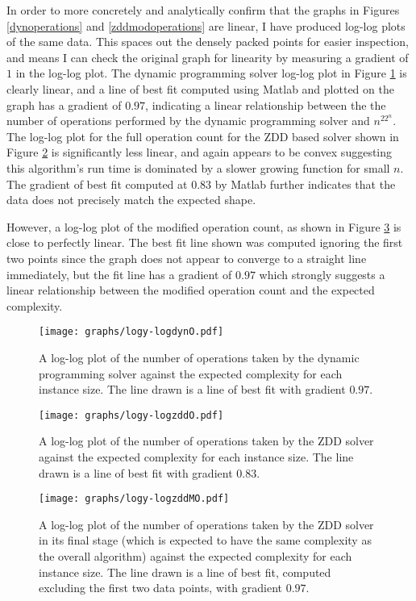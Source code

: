 \documentclass[12pt,a4paper,twoside,openright]{report}
\begin{document}
In order to more concretely and analytically confirm that the graphs in Figures \ref{dynoperations} and \ref{zddmodoperations} are linear, I have produced log-log plots of the same data. This spaces out the densely packed points for easier inspection, and means I can check the original graph for linearity by measuring a gradient of $1$ in the log-log plot. The dynamic programming solver log-log plot in Figure \ref{logdynoperations} is clearly linear, and a line of best fit computed using Matlab and plotted on the graph has a gradient of $0.97$, indicating a linear relationship between the the number of operations performed by the dynamic programming solver and $n^22^n$. The log-log plot for the full operation count for the ZDD based solver shown in Figure \ref{logzddoperations} is significantly less linear, and again appears to be convex suggesting this algorithm's run time is dominated by a slower growing function for small $n$. The gradient of best fit computed at $0.83$ by Matlab further indicates that the data does not precisely match the expected shape.

However, a log-log plot of the modified operation count, as shown in Figure \ref{logzddmodoperations} is close to perfectly linear. The best fit line shown was computed ignoring the first two points since the graph does not appear to converge to a straight line immediately, but the fit line has a gradient of $0.97$ which strongly suggests a linear relationship between the modified operation count and the expected complexity.

\begin{figure}[ht]
\centering
\texttt{[image: graphs/logy-logdynO.pdf]}
\caption{A log-log plot of the number of operations taken by the dynamic programming solver against the expected complexity for each instance size. The line drawn is a line of best fit with gradient $0.97$.}
\label{logdynoperations}
\end{figure}

\begin{figure}[ht]
\centering
\texttt{[image: graphs/logy-logzddO.pdf]}
\caption{A log-log plot of the number of operations taken by the ZDD solver against the expected complexity for each instance size. The line drawn is a line of best fit with gradient $0.83$.}
\label{logzddoperations}
\end{figure}

\begin{figure}[ht]
\centering
\texttt{[image: graphs/logy-logzddMO.pdf]}
\caption{A log-log plot of the number of operations taken by the ZDD solver in its final stage (which is expected to have the same complexity as the overall algorithm) against the expected complexity for each instance size. The line drawn is a line of best fit, computed excluding the first two data points, with gradient $0.97$.}
\label{logzddmodoperations}
\end{figure}
\end{document}
